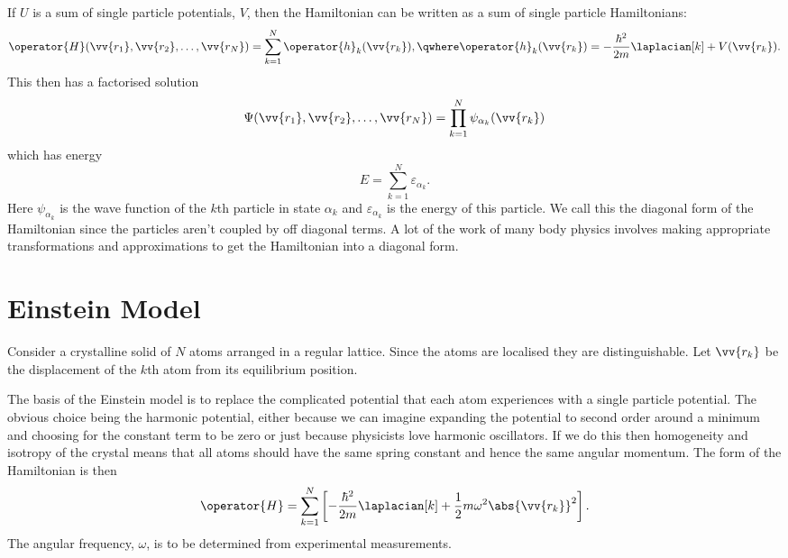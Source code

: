 \documentclass[fleqn]{NotesClass}
\begin{document}
    If \(U\) is a sum of single particle potentials, \(V\), then the Hamiltonian can be written as a sum of single particle Hamiltonians:
    \begin{equation}
        \operator{H}(\vv{r_1}, \vv{r_2}, \dotsc, \vv{r_N}) = \sum_{k = 1}^{N} \operator{h}_k(\vv{r_k}), \qwhere \operator{h}_k(\vv{r_k}) = -\frac{\hbar^2}{2m} \laplacian[k] + V(\vv{r_k}).
    \end{equation}
    This then has a factorised solution
    \begin{equation}
        \Psi(\vv{r_1}, \vv{r_2}, \dotsc, \vv{r_N}) = \prod_{k = 1}^{N} \psi_{\alpha_k}(\vv{r_k})
    \end{equation}
    which has energy
    \begin{equation}
        E = \sum_{k = 1}^{N} \varepsilon_{\alpha_k}.
    \end{equation}
    Here \(\psi_{\alpha_k}\) is the wave function of the \(k\)th particle in state \(\alpha_k\) and \(\varepsilon_{\alpha_k}\) is the energy of this particle.
    We call this the diagonal form of the Hamiltonian since the particles aren't coupled by off diagonal terms.
    A lot of the work of many body physics involves making appropriate transformations and approximations to get the Hamiltonian into a diagonal form.
    
    \section{Einstein Model}
    Consider a crystalline solid of \(N\) atoms arranged in a regular lattice.
    Since the atoms are localised they are distinguishable.
    Let \(\vv{r_k}\) be the displacement of the \(k\)th atom from its equilibrium position.
    
    The basis of the Einstein model is to replace the complicated potential that each atom experiences with a single particle potential.
    The obvious choice being the harmonic potential, either because we can imagine expanding the potential to second order around a minimum and choosing for the constant term to be zero or just because physicists love harmonic oscillators.
    If we do this then homogeneity and isotropy of the crystal means that all atoms should have the same spring constant and hence the same angular momentum.
    The form of the Hamiltonian is then
    \begin{equation}
        \operator{H} = \sum_{k = 1}^{N} \left[ -\frac{\hbar^2}{2m}\laplacian[k] + \frac{1}{2}m\omega^2\abs{\vv{r_k}}^2 \right].
    \end{equation}
    The angular frequency, \(\omega\), is to be determined from experimental measurements.
    
\end{document}
